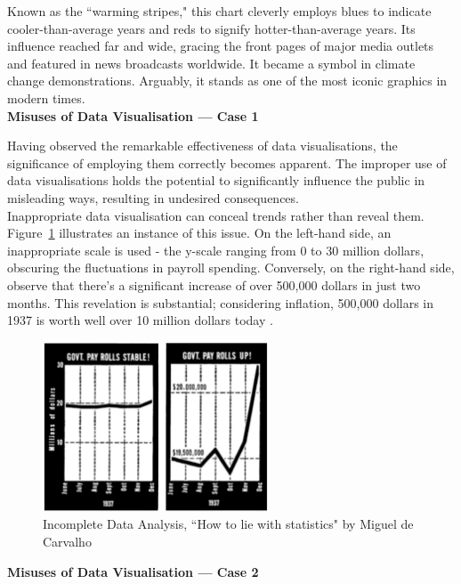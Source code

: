 \documentclass{article}\usepackage[]{graphicx}\usepackage[]{xcolor}
\numberwithin{equation}{section}
\begin{document}
\noindent 
Known as the ``warming stripes," this chart cleverly employs blues to indicate cooler-than-average years and reds to signify hotter-than-average years. Its influence reached far and wide, gracing the front pages of major media outlets and featured in news broadcasts worldwide. It became a symbol in climate change demonstrations. Arguably, it stands as one of the most iconic graphics in modern times.\\

\noindent
\textbf{Misuses of Data Visualisation — Case 1}

\noindent
Having observed the remarkable effectiveness of data visualisations, the significance of employing them correctly becomes apparent. The improper use of data visualisations holds the potential to significantly influence the public in misleading ways, resulting in undesired consequences.\\

\noindent
Inappropriate data visualisation can conceal trends rather than reveal them. Figure~\ref{fig:misuse1} illustrates an instance of this issue. On the left-hand side, an inappropriate scale is used - the y-scale ranging from 0 to 30 million dollars, obscuring the fluctuations in payroll spending. Conversely, on the right-hand side, observe that there's a significant increase of over 500,000 dollars in just two months. This revelation is substantial; considering inflation, 500,000 dollars in 1937 is worth well over 10 million dollars today \cite{worth}.

\begin{figure}[H]
    \centering
    \includegraphics[width=0.6\textwidth]{image_reference/misuse1.png}
    \caption{Incomplete Data Analysis, ``How to lie with statistics" by Miguel de Carvalho \cite{lie}}
    \label{fig:misuse1}
\end{figure}

\noindent 
\textbf{Misuses of Data Visualisation — Case 2}
\end{document}
